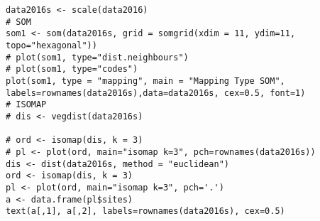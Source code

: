 \documentclass{article}
\begin{document}
\begin{enumerate}
\begin{lstlisting}[frame=single]
data2016s <- scale(data2016)
# SOM
som1 <- som(data2016s, grid = somgrid(xdim = 11, ydim=11, topo="hexagonal"))
# plot(som1, type="dist.neighbours")
# plot(som1, type="codes")
plot(som1, type = "mapping", main = "Mapping Type SOM", labels=rownames(data2016s),data=data2016s, cex=0.5, font=1)
# ISOMAP
# dis <- vegdist(data2016s)

# ord <- isomap(dis, k = 3)
# pl <- plot(ord, main="isomap k=3", pch=rownames(data2016s))
dis <- dist(data2016s, method = "euclidean")
ord <- isomap(dis, k = 3)
pl <- plot(ord, main="isomap k=3", pch='.')
a <- data.frame(pl$sites)
text(a[,1], a[,2], labels=rownames(data2016s), cex=0.5)

\end{lstlisting}

\end{enumerate}
\end{document}
